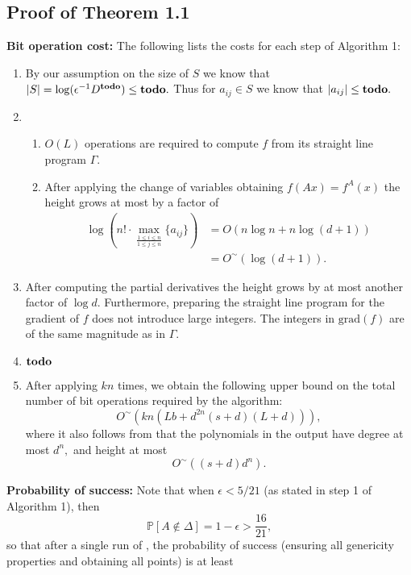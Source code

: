 \documentclass[sigconf]{acmart}
\def\td{{\bf todo}}
\def\pr{\mathbb{P}}
\def\grad{\textrm{grad}}
\def\D{\Delta}
\begin{document}
%
\subsection{Proof of Theorem 1.1}
%
\textbf{Bit operation cost:} The following lists the costs for each step of Algorithm 1:
%
\begin{enumerate}
    \item By our assumption on the size of $S$ we know that $|S| = \log (\epsilon^{-1}D^{\td}) \leq \td.$ Thus for $a_{ij} \in S$ we know that $|a_{ij}| \leq \td.$
    \item 
    \begin{enumerate}[label=\roman*.]
        \item $O(L)$ operations are required to compute $f$ from its straight line program $\Gamma.$
        \item After applying the change of variables obtaining $f(A x)=f^A(x)$ the height grows at most by a factor of
        \begin{align*}
        \log(n!\cdot \max_{\frac{1\leq i\leq n}{1\leq j\leq n}}\{a_{ij}\}) &= 
        O(n\log n + n\log(d+1)) \\
        &= 
        O^\sim(\log(d+1)).
        \end{align*}
    \end{enumerate}
    \item After computing the partial derivatives the height grows by at most another factor of $\log d$. Furthermore, preparing the straight line program for the gradient of $f$ does not introduce large integers. The integers in $\grad (f)$ are of the same magnitude as in $\Gamma$.
    \item $\td$
    \item 
    After applying \cite[Algorithm 2]{SH} $kn$ times, we obtain the
    following upper bound on the total number of bit operations required by the algorithm:
    \[
    O^\sim(kn(Lb+d^{2n}(s+d)(L+d))),
    \]
    where it also follows from \cite[Algorithm 2]{SH} that the polynomials in the output have degree at most $d^n,$ and height at most
    \[
    O^{\sim}((s+d)d^n).
    \]
\end{enumerate}
%
\par \noindent 
\textbf{Probability of success:} Note that when $\epsilon < 5/21$ (as stated in step 1 of Algorithm 1), then
\[
\pr[A \not \in \D] = 1-\epsilon > \frac{16}{21},
\]
so that after a single run of \cite[Algorithm 2]{SH}, the probability of success (ensuring all genericity properties and obtaining all points) is at least 
\end{document}
